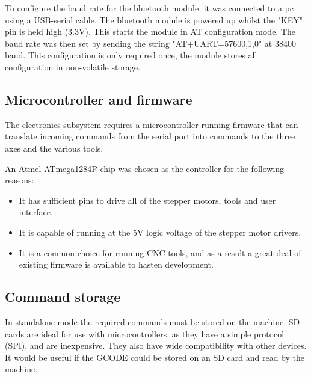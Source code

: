 To configure the baud rate for the bluetooth module, it was connected to a pc using a USB-serial cable. The bluetooth module is powered up whilst the "KEY" pin is held high (3.3V).
This starts the module in AT configuration mode. The baud rate was then set by sending the string "AT+UART=57600,1,0" at 38400 baud. This configuration is only required once,
the module stores all configuration in non-volatile storage.

\subsection{Microcontroller and firmware}
The electronics subsystem requires a microcontroller running firmware
that can translate incoming commands from the serial port into commands
to the three axes and the various tools. 

An Atmel ATmega1284P chip was chosen as the controller for the following reasons:

\begin{itemize} \itemsep0em
	\item	It has sufficient pins to drive all of the stepper motors, tools and user interface.
	\item	It is capable of running at the 5V logic voltage of the stepper motor drivers.
	\item	It is a common choice for running CNC tools, and as a result a great deal
			of existing firmware is available to hasten development.
\end{itemize}



\subsection{Command storage}
In standalone mode the required commands must be stored on the machine. 
SD cards are ideal for use with microcontrollers, as they have a simple protocol 
(SPI), and are inexpensive. They also have wide compatibility with other devices. It would be useful if 
the GCODE could be stored on an SD card and read by the machine.

